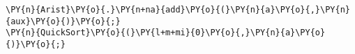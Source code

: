 \begin{Verbatim}[commandchars=\\\{\}]
\PY{n}{Arist}\PY{o}{.}\PY{n+na}{add}\PY{o}{(}\PY{n}{a}\PY{o}{,}\PY{n}{aux}\PY{o}{)}\PY{o}{;}	
\PY{n}{QuickSort}\PY{o}{(}\PY{l+m+mi}{0}\PY{o}{,}\PY{n}{a}\PY{o}{)}\PY{o}{;}
\end{Verbatim}

